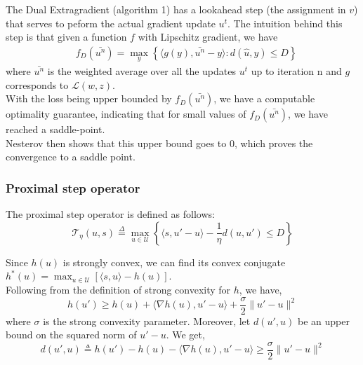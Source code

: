 \documentclass{article}
\begin{document}
The Dual Extragradient (algorithm 1) has a lookahead step (the assignment in $v$) that serves to peform the actual
gradient update $u^t$. The intuition behind this step is that given a
function $f$ with Lipschitz gradient, we have
\begin{equation*}
\begin{aligned}
    &f_{D}(\bar{u^n}) = \max_y \left \{ \langle g(y),\bar{u^n} - y\rangle : d(\hat{u},y) \leq D \right \}   
\end{aligned}
\end{equation*}
where $\bar{u^n}$ is the weighted
average over all the updates $u^t$ up to iteration n and $g$ corresponds
to $\mathcal{L}( w, z)$.\\
With the loss being upper bounded by $f_D(\bar{u^n})$, we have a computable optimality guarantee, indicating that for small values of $f_D(\bar{u^n})$, we have reached a saddle-point.\\
Nesterov then shows that this upper bound goes to $0$, which proves the convergence to a saddle point.
\subsubsection{Proximal step operator}
The proximal step operator is defined as follows:
\begin{equation}
  \mathcal{T}_{\eta}( u,  s) \overset{\Delta}{=} \max_{ u \in \mathcal{U}} \left \{ \langle  s,  u' -  u \rangle - \frac{1}{\eta}  d( u,  u') \leq D \right \}
\end{equation}

Since $h( u)$ is strongly convex, we can find its convex conjugate $h^*( u) = \max_{ u  \in \mathcal{U}} \left [ \langle  s,  u \rangle - h( u) \right ]$.\\
Following from the definition of strong convexity for $h$, we have,
\begin{equation}
  h( u') \geq h( u) + \langle \nabla h( u),  u'  -  u \rangle + \frac{\sigma}{2} \lVert  u' -  u \rVert^2
\end{equation}
where $\sigma$ is the strong convexity parameter. Moreover, let $d( u',  u)$ be an upper bound on the squared norm of $ u' -  u$. We get,
\begin{equation}
  d( u',  u) \triangleq h( u') - h( u) - \langle \nabla h( u),  u' -  u \rangle \geq \frac{\sigma}{2} \lVert  u' -  u \rVert^2
\end{equation}
\end{document}
